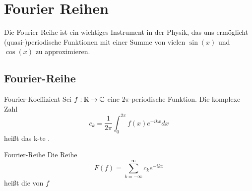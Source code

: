 \newpage
\section[Fourier Reihen]{Fourier Reihen}
Die Fourier-Reihe ist ein wichtiges Instrument in der Physik, das uns ermöglicht (quasi-)periodische Funktionen mit einer Summe von vielen $\sin(x)$ und $\cos(x)$ zu approximieren.
\subsection{Fourier-Reihe}\label{ssec:Fourier}


\begin{Def}{Fourier-Koeffizient}
Sei $f:\mathbb{R} \rightarrow \mathbb{C}$ eine $2\pi$-periodische Funktion. Die komplexe Zahl
$$c_k=\frac{1}{2\pi}\int_0^{2\pi}f(x)e^{-ikx}dx$$
heißt das k-te .
\end{Def}
\begin{Def}{Fourier-Reihe}
Die Reihe $$F(f)=\sum_{k=-\infty}^\infty c_ke^{-ikx}$$ heißt die  von $f$
\end{Def}
